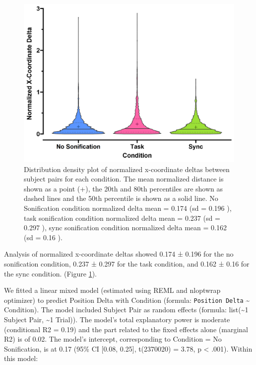 \documentclass[10pt,a4paper,onecolumn]{article}
\begin{document}
\begin{figure}[h]

{\centering \includegraphics[width=1\linewidth]{figures/parwise_position_delta} 

}

\caption{Distribution density plot of normalized x-coordinate deltas between subject pairs for each condition. The mean normalized distance is shown as a point (+), the 20th and 80th percentiles are shown as dashed lines and the 50th percentile is shown as a solid line. No Sonification condition normalized delta mean  =  0.174 (sd =  0.196 ), task sonification condition normalized delta mean =  0.237 (sd =  0.297 ), sync sonification condition normalized delta mean =  0.162 (sd =  0.16 ).}\label{fig:pairwise-position-delta}
\end{figure}

Analysis of normalized x-coordinate deltas showed 0.174 ± 0.196 for the no sonification condition,
0.237 ± 0.297 for the task condition, and
0.162 ± 0.16 for the sync condition. (Figure \ref{fig:pairwise-position-delta}).

We fitted a linear mixed model (estimated using REML and nloptwrap optimizer) to predict Position Delta with Condition (formula: \texttt{Position\ Delta} \textasciitilde{} Condition). The model included Subject Pair as random effects (formula: list(\textasciitilde1 \textbar{} Subject Pair, \textasciitilde1 \textbar{} Trial)). The model's total explanatory power is moderate (conditional R2 = 0.19) and the part related to the fixed effects alone (marginal R2) is of 0.02. The model's intercept, corresponding to Condition = No Sonification, is at 0.17 (95\% CI {[}0.08, 0.25{]}, t(2370020) = 3.78, p \textless{} .001). Within this model:
\end{document}
